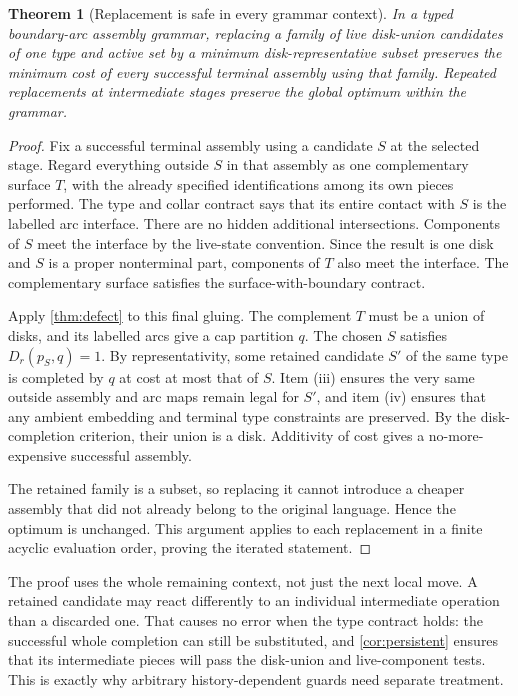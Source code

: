 \documentclass[11pt,a4paper]{article}
\newtheorem{theorem}{Theorem}[section]
\theoremstyle{definition}
\theoremstyle{remark}
\begin{document}
\begin{theorem}[Replacement is safe in every grammar context]\label{thm:composition}
In a typed boundary-arc assembly grammar, replacing a family of live disk-union
candidates of one type and active set by a minimum disk-representative subset
preserves the minimum cost of every successful terminal assembly using that family.
Repeated replacements at intermediate stages preserve the global optimum within
the grammar.
\end{theorem}
\begin{proof}
Fix a successful terminal assembly using a candidate $S$ at the selected stage.
Regard everything outside $S$ in that assembly as one complementary surface $T$,
with the already specified identifications among its own pieces performed. The type
and collar contract says that its entire contact with $S$ is the labelled arc interface.
There are no hidden additional intersections. Components of $S$ meet the interface
by the live-state convention. Since the result is one disk and $S$ is a proper
nonterminal part, components of $T$ also meet the interface. The complementary
surface satisfies the surface-with-boundary contract.

Apply \cref{thm:defect} to this final gluing. The complement $T$ must be a union
of disks, and its labelled arcs give a cap partition $q$. The chosen $S$ satisfies
$D_r(p_S,q)=1$. By representativity, some retained candidate $S'$ of the same type
is completed by $q$ at cost at most that of $S$. Item (iii) ensures the very same
outside assembly and arc maps remain legal for $S'$, and item (iv) ensures that any
ambient embedding and terminal type constraints are preserved. By the disk-completion
criterion, their union is a disk. Additivity of cost gives a no-more-expensive successful
assembly.

The retained family is a subset, so replacing it cannot introduce a cheaper assembly
that did not already belong to the original language. Hence the optimum is unchanged.
This argument applies to each replacement in a finite acyclic evaluation order,
proving the iterated statement.
\end{proof}

The proof uses the whole remaining context, not just the next local move. A retained
candidate may react differently to an individual intermediate operation than a discarded
one. That causes no error when the type contract holds: the successful whole completion
can still be substituted, and \cref{cor:persistent} ensures that its intermediate pieces
will pass the disk-union and live-component tests. This is exactly why arbitrary
history-dependent guards need separate treatment.
\end{document}
